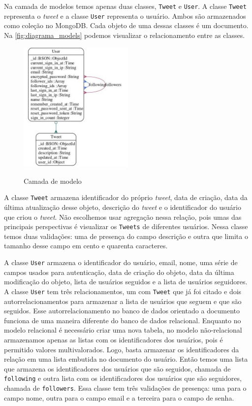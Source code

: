 Na camada de modelos temos apenas duas classes, \verb|Tweet| e \verb|User|. A classe \verb|Tweet| representa o \textit{tweet} e a classe \verb|User| representa o usuário. Ambos são armazenados como coleção no MongoDB. Cada objeto de uma dessas classes é um documento. Na \autoref{fig:diagrama_models} podemos visualizar o relacionamento entre as classes.
\begin{figure}[H]
    \centering
    \caption{Camada de modelo}
    \includegraphics[width=0.5\textwidth]{./04-figuras/models_complete.jpg}
    \label{fig:diagrama_models}
\end{figure}
A classe \verb|Tweet| armazena identificador do próprio \textit{tweet}, data de criação, data da última atualização desse objeto, descrição do \textit{tweet} e o identificador do usuário que criou o \textit{tweet}. Não escolhemos usar agregação nessa relação, pois umas das principais perspectivas é visualizar os \verb|Tweets| de diferentes usuários. Nessa classe temos duas validações: uma de presença do campo descrição e outra que limita o tamanho desse campo em cento e quarenta caracteres.

A classe \verb|User| armazena o identificador do usuário, email, nome, uma série de campos usados para autenticação, data de criação do objeto, data da última modificação do objeto, lista de usuários seguidos e a lista de usuários seguidores. A classe \verb|User| tem três relacionamentos, um com \verb|Tweet| que já foi citado e dois autorrelacionamentos para armazenar a lista de usuários que seguem e que são seguidos. Esse autorrelacionamento no banco de dados orientado a documento funciona de uma maneira diferente do banco de dados relacional.
Enquanto no modelo relacional é necessário criar uma nova tabela, no modelo não-relacional armazenamos apenas as listas com os identificadores dos usuários, pois é permitido valores multivalorados. Logo, basta armazenar os identificadores da relação em uma lista embutida no documento do usuário. Então temos uma lista que armazena os identificadores dos usuários que são seguidos, chamada de \verb|following| e outra lista com os identificadores dos usuários que são seguidores, chamada de \verb|followers|.
Essa classe tem três validações de presença: uma para o campo nome, outra para o campo email e a terceira para o campo de senha.

